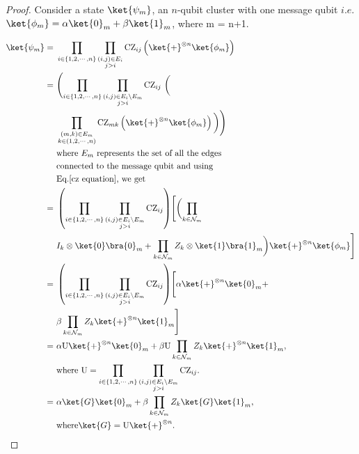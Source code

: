 \documentclass[reprint, amsmath,amssymb, aps,pra,
 floatfix,
]{revtex4-2}
\begin{document}
\begin{proof}
Consider a state $\ket{\psi_m}$, an $n$-qubit cluster with one message qubit $i.e.$  $\ket{\phi_{m}} = \alpha\ket{0}_{m} + \beta\ket{1}_{m}$, where m = n+1. 

\begin{equation*}
\begin{split}
    \ket{\psi_m} = \ & \prod_{i \in \{1,2,\cdots,n\}} \prod_{ \substack{(i,j) \in E_i \\ j>i }}\mathrm{CZ}_{ij} \left ( \ket{+}^{\otimes n}\ket{\phi_{m}}\right ) \\
     = \ &  \Biggl ( \prod_{i \in \{1,2,\cdots,n\}} \prod_{ \substack{(i,j) \in E_i\setminus	E_m \\  j>i }}\mathrm{CZ}_{ij}  \ \biggl( \\  & \prod_{\substack{(m,k)\in E_{m} \\ k \in (1,2,\cdots ,n)}}\mathrm{CZ}_{mk} \left ( \ket{+}^{\otimes n} \ket{\phi_{m}}\right ) \biggl )\Biggl ) \\
     \ & \text{where $E_{m}$ represents the set of all the edges} \\ & \text{connected to the message qubit and using} \\ & \text{Eq.\eqref{cz equation}, we get}\\
     = \ &  \left ( \prod_{i \in \{1,2,\cdots,n\}} \prod_{ \substack{(i,j) \in E_i\setminus	E_m \\  j>i }}\mathrm{CZ}_{ij}\right)  \Biggr [ \biggl (  
    \prod_{k\in \mathcal{N}_{m}} \\ & I_k \otimes \ket{0}\bra{0}_{m}+\prod_{k\in \mathcal{N}_{m}}Z_k \otimes \ket{1}\bra{1}_{m} \biggl )  \ket{+}^{\otimes n}\ket{\phi_{m}}\Biggr ] \\
    = \ &  \left ( \prod_{i \in \{1,2,\cdots,n\}} \prod_{ \substack{(i,j) \in E_i\setminus	E_m \\  j>i }}\mathrm{CZ}_{ij}\right)  \Biggr[  \alpha  \ket{+}^{\otimes n} \ket{0}_{m}  +  \\ & \beta \prod_{k\in \mathcal{N}_{m}}Z_k   \ket{+}^{\otimes n} \ket{1}_{m}\Biggr] \\
    = \ & \alpha \mathrm{U} \ket{+}^{\otimes n }  \ket{0}_{m} +  \beta \mathrm{U}  \prod_{k\in \mathcal{N}_{m}}Z_k \ket{+}^{\otimes n} \ket{1}_{m}, \\ &  \text{where } \mathrm{U}  = \prod_{i \in \{1,2,\cdots,n\}} \prod_{ \substack{(i,j) \in E_i\setminus	E_m \\  j>i }}\mathrm{CZ}_{ij}. \\
    = \ & \alpha \ket{G}  \ket{0}_{m} +  \beta  \prod_{k\in \mathcal{N}_{m}}Z_k \ket{G}\ket{1}_{m}, \\ & \text{where} \ket{G} = \mathrm{U} \ket{+}^{\otimes n }.

\end{split}
\end{equation*}
\end{proof}
\end{document}
